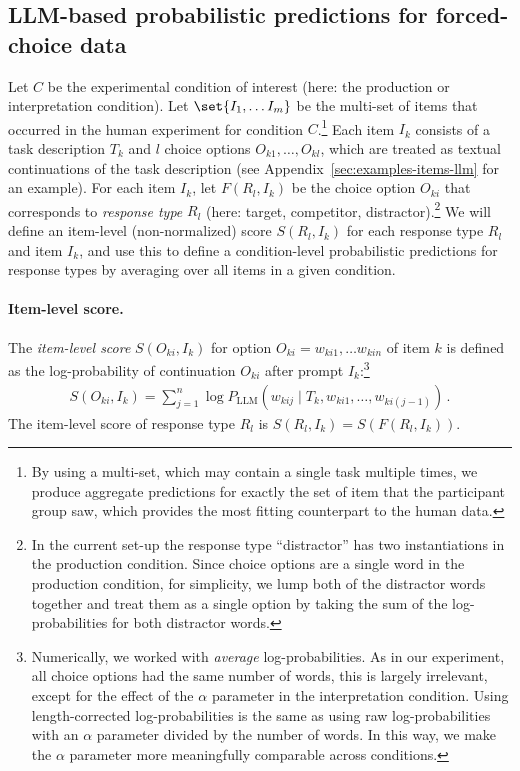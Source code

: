 \documentclass[fleqn]{article}
\begin{document}
\subsection{LLM-based probabilistic predictions for forced-choice data}
\label{sec:notat--term}

Let $C$ be the experimental condition of interest (here: the production or interpretation condition).
Let \(\set{I_1, \dots I_m}\) be the multi-set of items that occurred in the human experiment for condition $C$.\footnote{
  By using a multi-set, which may contain a single task multiple times, we produce aggregate predictions for exactly the set of item that the participant group saw, which provides the most fitting counterpart to the human data.
}
Each item $I_{k}$ consists of a task description $T_{k}$ and $l$ choice options $O_{k1}, \dots, O_{kl}$, which are treated as textual continuations of the task description (see Appendix~\ref{sec:examples-items-llm} for an example).
For each item $I_{k}$, let $F(R_{l}, I_{k})$ be the choice option $O_{ki}$ that corresponds to \emph{response type} $R_{l}$ (here: target, competitor, distractor).\footnote{In the current set-up the response type ``distractor'' has two instantiations in the production condition. Since choice options are a single word in the production condition, for simplicity, we lump both of the distractor words together and treat them as a single option by taking the sum of the log-probabilities for both distractor words.}
We will define an item-level (non-normalized) score $S(R_{l}, I_{k})$ for each response type $R_{l}$ and item $I_{k}$, and use this to define a condition-level probabilistic predictions for response types by averaging over all items in a given condition.

\paragraph{Item-level score.}
The \emph{item-level score} $S(O_{{ki}}, I_{k})$ for option $O_{ki} = w_{ki1}, \dots w_{kin}$ of item $k$ is defined as the log-probability of continuation $O_{ki}$ after prompt $I_{k}$:\footnote{Numerically, we worked with \emph{average} log-probabilities. As in our experiment, all choice options had the same number of words, this is largely irrelevant, except for the effect of the $\alpha$ parameter in the interpretation condition. Using length-corrected log-probabilities is the same as using raw log-probabilities with an $\alpha$ parameter divided by the number of words. In this way, we make the $\alpha$ parameter more meaningfully comparable across conditions.}
%
\begin{align*}
S(O_{ki}, I_{k}) =  \sum_{j=1}^n \log P_{\text{LLM}} \left(w_{kij} \mid T_{k}, w_{ki1}, \dots, w_{ki(j-1)} \right)  \,.
\end{align*}
%
The item-level score of response type $R_{l}$ is $S(R_{l}, I_{k}) = S(F(R_{l}, I_{k}))$.
\end{document}
